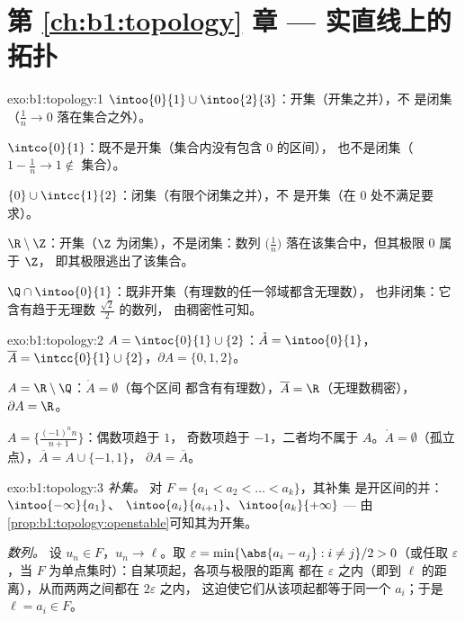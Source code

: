 \section*{第 \ref{ch:b1:topology} 章 --- 实直线上的拓扑}

\begin{solution}{exo:b1:topology:1}
$\intoo{0}{1} \cup \intoo{2}{3}$：开集（开集之并），不
是闭集（$\frac 1n \to 0$ 落在集合之外）。

$\intco{0}{1}$：既不是开集（集合内没有包含 $0$ 的区间），
也不是闭集（$1 - \frac1n \to 1 \notin$ 集合）。

$\{0\} \cup \intcc{1}{2}$：闭集（有限个闭集之并），不
是开集（在 $0$ 处不满足要求）。

$\R \setminus \Z$：开集（$\Z$ 为闭集），不是闭集：数列
$\bigl(\frac 1n\bigr)$ 落在该集合中，但其极限 $0$ 属于 $\Z$，
即其极限逃出了该集合。

$\Q \cap \intoo{0}{1}$：既非开集（有理数的任一邻域都含无理数），
也非闭集：它含有趋于无理数 $\frac{\sqrt 2}{2}$ 的数列，
由稠密性可知。
\end{solution}

\begin{solution}{exo:b1:topology:2}
$A = \intoc{0}{1} \cup \{2\}$：$\mathring A = \intoo{0}{1}$，
$\overline A = \intcc{0}{1} \cup \{2\}$，$\partial A = \{0, 1, 2\}$。

$A = \R \setminus \Q$：$\mathring A = \emptyset$（每个区间
都含有有理数），$\overline A = \R$（无理数稠密），
$\partial A = \R$。

$A = \bigl\{\frac{(-1)^n n}{n+1}\bigr\}$：偶数项趋于 $1$，
奇数项趋于 $-1$，二者均不属于 $A$。$\mathring A =
\emptyset$（孤立点），$\overline A = A \cup \{-1, 1\}$，
$\partial A = \overline A$。
\end{solution}

\begin{solution}{exo:b1:topology:3}
\emph{补集。} 对 $F = \{a_1 < a_2 < \dots < a_k\}$，其补集
是开区间的并：$\intoo{-\infty}{a_1}$、
$\intoo{a_i}{a_{i+1}}$、$\intoo{a_k}{+\infty}$ --- 由
\cref{prop:b1:topology:openstable}可知其为开集。

\emph{数列。} 设 $u_n \in F$，$u_n \to \ell$。取 $\varepsilon
= \min\{\abs{a_i - a_j} : i \neq j\}/2 > 0$（或任取 $\varepsilon$，当
$F$ 为单点集时）：自某项起，各项与极限的距离
都在 $\varepsilon$ 之内（即到 $\ell$ 的距离），从而两两之间都在 $2\varepsilon$ 之内，
这迫使它们从该项起都等于同一个 $a_i$；于是
$\ell = a_i \in F$。
\end{solution}

